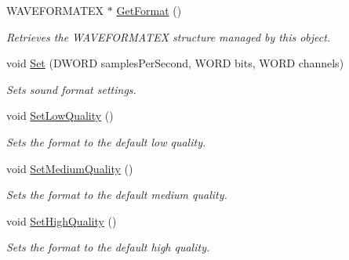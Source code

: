 \begin{DoxyCompactItemize}
WAVEFORMATEX $\ast$ \hyperlink{class_sound_format_a2f06c480219386d0653247594192d60d}{GetFormat} ()
\begin{DoxyCompactList}\small\item\em Retrieves the WAVEFORMATEX structure managed by this object. \item\end{DoxyCompactList}\item 
void \hyperlink{class_sound_format_ab131528d609da25a0dd530969c95964e}{Set} (DWORD samplesPerSecond, WORD bits, WORD channels)
\begin{DoxyCompactList}\small\item\em Sets sound format settings. \item\end{DoxyCompactList}\item 
void \hyperlink{class_sound_format_aba32775cb719e317ea16ed70763ae3e8}{SetLowQuality} ()
\begin{DoxyCompactList}\small\item\em Sets the format to the default low quality. \item\end{DoxyCompactList}\item 
void \hyperlink{class_sound_format_a1bd0ed3f9958518deed72ddc22d778a7}{SetMediumQuality} ()
\begin{DoxyCompactList}\small\item\em Sets the format to the default medium quality. \item\end{DoxyCompactList}\item 
void \hyperlink{class_sound_format_a744fca810c40d91c50fed4ab8353a26f}{SetHighQuality} ()
\begin{DoxyCompactList}\small\item\em Sets the format to the default high quality. \item\end{DoxyCompactList}\end{DoxyCompactItemize}
